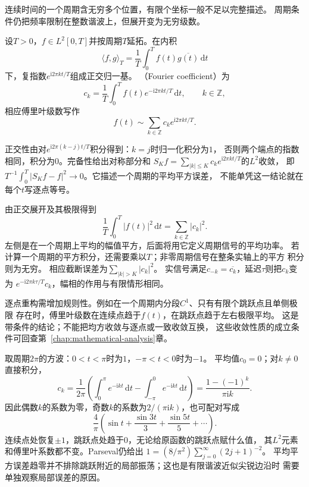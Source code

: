 连续时间的一个周期含无穷多个位置，有限个坐标一般不足以完整描述。
周期条件仍把频率限制在整数谐波上，但展开变为无穷级数。
\begin{definition}[周期信号的傅里叶系数与级数]
  \label{def:signal-analysis-fourier-series}
  设$T>0$，$f\in L^2[0,T]$并按周期$T$延拓。在内积
  \[
    \langle f,g\rangle_T=\frac1T\int_0^T f(t)\overline{g(t)}\,\mathrm dt
  \]
  下，复指数$e^{\mathrm i2\pi kt/T}$组成正交归一基。
  （Fourier coefficient）为
  \[
    c_k=\frac1T\int_0^T f(t)e^{-\mathrm i2\pi kt/T}\,\mathrm dt,
    \qquad k\in\mathbb Z,
  \]
  相应傅里叶级数写作
  \begin{equation}
    f(t)\sim\sum_{k\in\mathbb Z}c_ke^{\mathrm i2\pi kt/T}.
    \label{eq:signal-analysis-fourier-series}
  \end{equation}
\end{definition}
正交性由对$e^{\mathrm i2\pi(k-j)t/T}$积分得到：$k=j$时归一化积分为$1$，
否则两个端点的指数相同，积分为$0$。完备性给出对称部分和
$S_Kf=\sum_{|k|\leq K}c_ke^{\mathrm i2\pi kt/T}$的$L^2$收敛，
即$T^{-1}\int_0^T|S_Kf-f|^2\to0$。它描述一个周期的平均平方误差，
不能单凭这一结论就在每个$t$写逐点等号。

由正交展开及其极限得到
\begin{equation}
  \frac1T\int_0^T|f(t)|^2\,\mathrm dt
  =\sum_{k\in\mathbb Z}|c_k|^2.
  \label{eq:signal-analysis-continuous-parseval}
\end{equation}
左侧是在一个周期上平均的幅值平方，后面将用它定义周期信号的平均功率。
若计算一个周期的平方积分，还需要乘以$T$；非零周期信号在整条实轴上的平方
积分则为无穷。
相应截断误差为$\sum_{|k|>K}|c_k|^2$。
实信号满足$c_{-k}=\overline{c_k}$，延迟$\tau$则把$c_k$变为
$e^{-\mathrm i2\pi k\tau/T}c_k$，幅相的作用与有限情形相同。

逐点重构需增加规则性。例如在一个周期内分段$C^1$、只有有限个跳跃点且单侧极限
存在时，傅里叶级数在连续点趋于$f(t)$，在跳跃点趋于左右极限平均。
这是带条件的结论；不能把均方收敛与逐点或一致收敛互换，
这些收敛性质的成立条件可回查第~\ref{chap:mathematical-analysis}章。

取周期$2\pi$的方波：$0<t<\pi$时为$1$，$-\pi<t<0$时为$-1$。
平均值$c_0=0$；对$k\neq0$直接积分，
\[
  c_k=\frac1{2\pi}\left(
    \int_0^\pi e^{-\mathrm ikt}\,\mathrm dt
    -\int_{-\pi}^0 e^{-\mathrm ikt}\,\mathrm dt\right)
  =\frac{1-(-1)^k}{\pi\mathrm ik}.
\]
因此偶数$k$的系数为零，奇数$k$的系数为$2/(\pi\mathrm ik)$，也可配对写成
\[
  \frac4\pi\left(\sin t+\frac{\sin3t}{3}+\frac{\sin5t}{5}+\cdots\right).
\]
连续点处恢复$\pm1$，跳跃点处趋于$0$，无论给原函数的跳跃点赋什么值，
其$L^2$元素和傅里叶系数都不变。Parseval仍给出
$1=(8/\pi^2)\sum_{j=0}^{\infty}(2j+1)^{-2}$。
平均平方误差趋零并不排除跳跃附近的局部振荡；这也是有限谐波近似尖锐边沿时
需要单独观察局部误差的原因。

